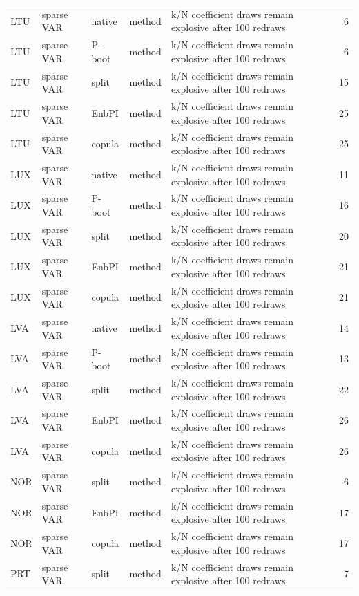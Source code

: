 {\begin{longtable}{@{}lllp{1.6cm}p{6.2cm}r@{}}
LTU & sparse VAR & native & method & k/N coefficient draws remain explosive after 100 redraws & 6 \\
LTU & sparse VAR & P-boot & method & k/N coefficient draws remain explosive after 100 redraws & 6 \\
LTU & sparse VAR & split & method & k/N coefficient draws remain explosive after 100 redraws & 15 \\
LTU & sparse VAR & EnbPI & method & k/N coefficient draws remain explosive after 100 redraws & 25 \\
LTU & sparse VAR & copula & method & k/N coefficient draws remain explosive after 100 redraws & 25 \\
LUX & sparse VAR & native & method & k/N coefficient draws remain explosive after 100 redraws & 11 \\
LUX & sparse VAR & P-boot & method & k/N coefficient draws remain explosive after 100 redraws & 16 \\
LUX & sparse VAR & split & method & k/N coefficient draws remain explosive after 100 redraws & 20 \\
LUX & sparse VAR & EnbPI & method & k/N coefficient draws remain explosive after 100 redraws & 21 \\
LUX & sparse VAR & copula & method & k/N coefficient draws remain explosive after 100 redraws & 21 \\
LVA & sparse VAR & native & method & k/N coefficient draws remain explosive after 100 redraws & 14 \\
LVA & sparse VAR & P-boot & method & k/N coefficient draws remain explosive after 100 redraws & 13 \\
LVA & sparse VAR & split & method & k/N coefficient draws remain explosive after 100 redraws & 22 \\
LVA & sparse VAR & EnbPI & method & k/N coefficient draws remain explosive after 100 redraws & 26 \\
LVA & sparse VAR & copula & method & k/N coefficient draws remain explosive after 100 redraws & 26 \\
NOR & sparse VAR & split & method & k/N coefficient draws remain explosive after 100 redraws & 6 \\
NOR & sparse VAR & EnbPI & method & k/N coefficient draws remain explosive after 100 redraws & 17 \\
NOR & sparse VAR & copula & method & k/N coefficient draws remain explosive after 100 redraws & 17 \\
PRT & sparse VAR & split & method & k/N coefficient draws remain explosive after 100 redraws & 7 \\

\end{longtable}}

